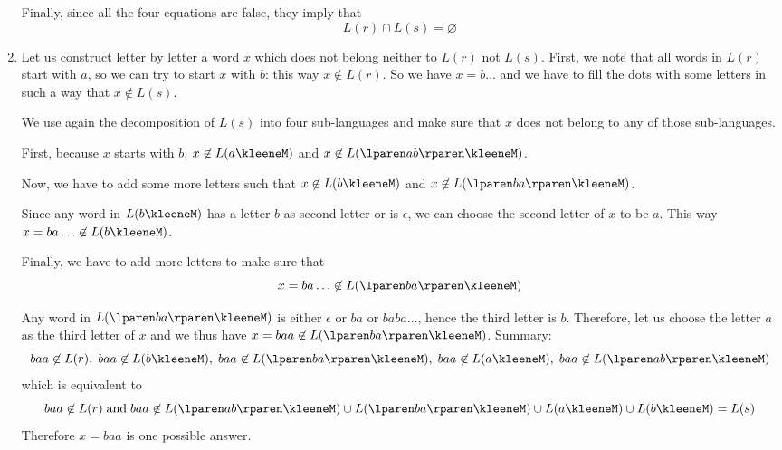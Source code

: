 \begin{enumerate}
\begin{enumerate}
      \end{enumerate}
      Finally, since all the four equations are false, they imply
      that \[L(r) \cap L(s) = \varnothing\]

    \item Let us construct letter by letter a word \(x\) which does
      not belong neither to \(L(r)\) not \(L(s)\). First, we note that
      all words in \(L(r)\) start with \(a\), so we can try to start
      \(x\) with \(b\): this way \(x \not\in L(r)\). So we have \(x =
      b\ldots\) and we have to fill the dots with some letters in such
      a way that \(x \not\in L(s)\).

      \smallskip

      We use again the decomposition of \(L(s)\) into four
      sub-languages and make sure that \(x\) does not belong to any of
      those sub-languages.

      \smallskip

      First, because \(x\) starts with \(b\), \(x \not\in
      L(a\kleeneM)\) and \(x \not\in L(\lparen ab \rparen\kleeneM)\).

      \smallskip

      Now, we have to add some more letters such that \(x \not\in
      L(b\kleeneM)\) and \(x \not\in L(\lparen ba \rparen\kleeneM)\).

      \smallskip

      Since any word in \(L(b\kleeneM)\) has a letter \(b\) as second
      letter or is \(\epsilon\), we can choose the second letter of
      \(x\) to be \(a\). This way \(x=ba\ldots \not\in L(b\kleeneM)\).

      \smallskip

      Finally, we have to add more letters to make sure that
      \[x=ba\ldots \not\in L(\lparen ba\rparen\kleeneM)\]

      \smallskip

      Any word in \(L(\lparen ba\rparen\kleeneM)\) is either
      \(\epsilon\) or \(ba\) or \(baba\ldots\), hence the third letter
      is \(b\). Therefore, let us choose the letter \(a\) as the third
      letter of \(x\) and we thus have \(x=baa \not\in L(\lparen
      ba\rparen\kleeneM)\). Summary:
      \[
        baa \not\in L(r), \;
        baa \not\in L(b\kleeneM), \;
        baa \not\in L(\lparen ba\rparen\kleeneM), \;
        baa \not\in L(a\kleeneM), \;
        baa \not\in L(\lparen ab\rparen\kleeneM)
      \]
      which is equivalent to
      \[
        baa \not\in L(r) \; \text{and} \; baa \not\in L(\lparen ab
        \rparen\kleeneM) \cup L(\lparen ba \rparen\kleeneM) \cup
        L(a\kleeneM) \cup L(b\kleeneM) = L(s)
      \]
      Therefore \(x=baa\) is one possible answer.

\end{enumerate}
